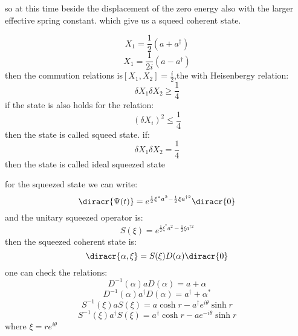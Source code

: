 so at this time beside the displacement of the zero energy also with the larger effective spring constant. which give us a squeed coherent state.\par
\[X_1=\frac{1}{2}(a+a^\dagger)\]
\[X_1=\frac{1}{2i}(a-a^\dagger)\]
then the commution relations is$[X_1,X_2]=\frac{i}{2}$,the with Heisenbergy relation:
\[\delta X_1\delta X_2\geq \frac{1}{4}\]
if the state is also holds for the relation:
\[(\delta X_i)^2\le \frac{1}{4}\] 
then the state is called squeed state. if:
\[\delta X_1\delta X_2=\frac{1}{4}\]
then the state is called ideal squeezed state\par
for the squeezed state we can write:
\[\diracr{\Psi(t)}=e^{\frac{1}{2}\xi^*a^2-\frac{1}{2}\xi a^{\dagger 2}}\diracr{0}\]
and the unitary squeezed operator is:
\[S(\xi)=e^{\frac{1}{2}\xi^*a^2-\frac{1}{2}\xi a^{\dagger 2}}\]
then the squeezed coherent state is:
\[\diracr{\alpha,\xi}=S(\xi)D(\alpha)\diracr{0}\]
one can check the relations:
\[D^{-1}(\alpha)aD(\alpha)=a+\alpha\]
\[D^{-1}(\alpha)a^\dagger D(\alpha)=a^\dagger+\alpha^*\]
\[S^{-1}(\xi)aS(\xi)=a\cosh r-a^\dagger e^{i\theta}\sinh r\]
\[S^{-1}(\xi)a^\dagger S(\xi)=a^\dagger \cosh r-ae^{-i\theta}\sinh r\]
where $\xi=re^{i\theta}$